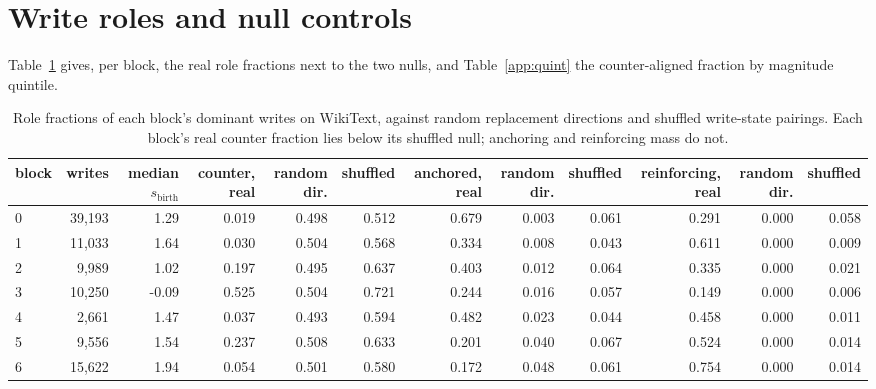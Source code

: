 \section{Write roles and null controls}\label{app:roles}
Table~\ref{app:nulls} gives, per block, the real role fractions next to the two nulls, and Table~\ref{app:quint} the counter-aligned fraction by magnitude quintile.
\begin{table}[H]\centering\scriptsize
\caption{Role fractions of each block's dominant writes on WikiText, against random replacement directions and shuffled write-state pairings. Each block's real counter fraction lies below its shuffled null; anchoring and reinforcing mass do not.}\label{app:nulls}
\begin{adjustbox}{max width=\linewidth}
\begin{tabular}{lrrrrrrrrrrr}\toprule
block & writes & median $s_{\mathrm{birth}}$ & counter, real & random dir. & shuffled & anchored, real & random dir. & shuffled & reinforcing, real & random dir. & shuffled \\ \midrule
0 & 39,193 & 1.29 & 0.019 & 0.498 & 0.512 & 0.679 & 0.003 & 0.061 & 0.291 & 0.000 & 0.058 \\
1 & 11,033 & 1.64 & 0.030 & 0.504 & 0.568 & 0.334 & 0.008 & 0.043 & 0.611 & 0.000 & 0.009 \\
2 & 9,989 & 1.02 & 0.197 & 0.495 & 0.637 & 0.403 & 0.012 & 0.064 & 0.335 & 0.000 & 0.021 \\
3 & 10,250 & -0.09 & 0.525 & 0.504 & 0.721 & 0.244 & 0.016 & 0.057 & 0.149 & 0.000 & 0.006 \\
4 & 2,661 & 1.47 & 0.037 & 0.493 & 0.594 & 0.482 & 0.023 & 0.044 & 0.458 & 0.000 & 0.011 \\
5 & 9,556 & 1.54 & 0.237 & 0.508 & 0.633 & 0.201 & 0.040 & 0.067 & 0.524 & 0.000 & 0.014 \\
6 & 15,622 & 1.94 & 0.054 & 0.501 & 0.580 & 0.172 & 0.048 & 0.061 & 0.754 & 0.000 & 0.014 \\
\bottomrule\end{tabular}\end{adjustbox}
\end{table}
